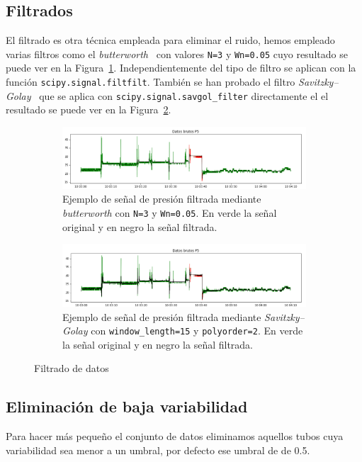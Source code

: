 \documentclass[a4paper,12pt,twoside,oldfontcommands]{memoir}
\begin{document}
\subsection{Filtrados}
El filtrado es otra técnica empleada para eliminar el ruido, hemos empleado varias filtros como el \textit{butterworth}~\cite{wiki:butter} con valores \texttt{N=3} y \texttt{Wn=0.05} cuyo resultado se puede ver en la Figura~\ref{fig:senalP5butter}. Independientemente del tipo de filtro se aplican con la función \texttt{scipy.signal.filtfilt}. También se han probado el filtro \textit{Savitzky–Golay}~\cite{wiki:savgol} que se aplica con \texttt{scipy.signal.savgol\_filter} directamente el el resultado se puede ver en la Figura~\ref{fig:senalP5savgol}.
\begin{figure}
    \centering
    \begin{subfigure}[b]{\textwidth}
        \includegraphics[width=1\textwidth]{images/SenalP5butter.png}
        \caption{Ejemplo de señal de presión filtrada mediante \textit{butterworth} con \texttt{N=3} y \texttt{Wn=0.05}. En verde la señal original y en negro la señal filtrada.}
        \label{fig:senalP5butter}
    \end{subfigure}
    \begin{subfigure}[b]{\textwidth}
        \includegraphics[width=1\textwidth]{images/SenalP5savgol.png}
        \caption{Ejemplo de señal de presión filtrada mediante \textit{Savitzky–Golay} con \texttt{window\_length=15} y \texttt{polyorder=2}. En verde la señal original y en negro la señal filtrada.}
        \label{fig:senalP5savgol}
    \end{subfigure}
    \caption{Filtrado de datos}
    \label{fig:filters}
\end{figure}

\subsection{Eliminación de baja variabilidad}
Para hacer más pequeño el conjunto de datos eliminamos aquellos tubos cuya variabilidad sea menor a un umbral, por defecto ese umbral de de 0.5.
\end{document}
